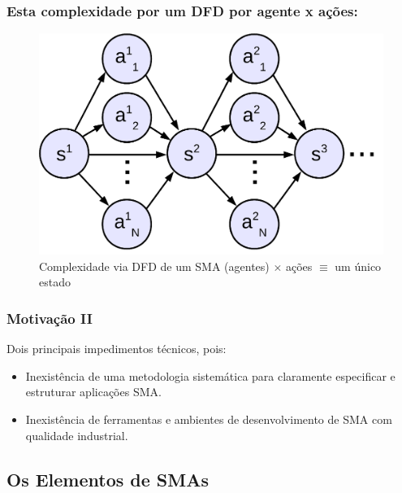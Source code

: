 \begin{frame}
\frametitle{Esta complexidade por um DFD por agente x ações:}
  
  \begin{figure}[!ht]
  \centering
  \includegraphics[height =.6\textheight,width=.7\textwidth]{figuras/mudando_estados01.png}
  \caption{Complexidade via DFD de um SMA (agentes) $\times $ ações $\equiv $ um único estado}
\end{figure}
   
\end{frame}




\begin{frame}

    \frametitle{Motivação II}
   Dois principais impedimentos técnicos, pois:
    \begin{itemize}
    \pause
      \item Inexistência de uma metodologia sistemática para 
      claramente especificar e estruturar aplicações SMA.
     \pause
      \item Inexistência de ferramentas e ambientes de 
desenvolvimento de SMA com qualidade industrial.
    
    \end{itemize}
\end{frame}


\subsection{Os Elementos de SMAs}



